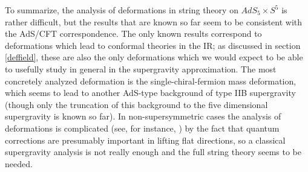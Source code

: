 To summarize, the analysis of deformations in string theory on
$AdS_5\times S^5$ is rather difficult, but the results that are known
so far seem to be consistent with the AdS/CFT correspondence. The only
known results correspond to deformations which lead to conformal
theories in the IR; as discussed in section \ref{deffield}, these are
also the only deformations which we would expect to be able to
usefully study in general in the supergravity approximation. The most
concretely analyzed deformation is the single-chiral-fermion mass
deformation, which seems to lead to another AdS-type background of
type IIB supergravity (though only the truncation of this background
to the five dimensional supergravity is known so far). In
non-supersymmetric cases the analysis of deformations is complicated
(see, for instance, \cite{Berkooz:1999qp}) by the fact that quantum
corrections are presumably important in lifting flat directions, so a
classical supergravity analysis is not really enough and the full
string theory seems to be needed.


